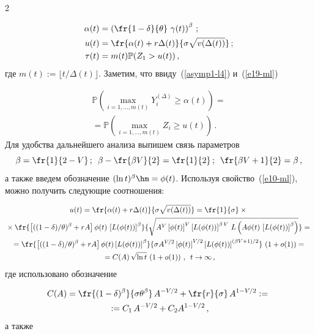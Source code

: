 \begin{multicols}{2}
\vspace*{-2pt}

\noindent
\begin{align*}
\alpha(t)&=\left( \fr{1-\delta}{\theta}\,\,\gamma (t) \right)^\beta\,;\\
u(t)&= \fr{ \alpha(t)+r\Delta(t)}{\sigma\sqrt{v(\Delta(t))}}\,;\\
\tau(t)&= m(t)\mathbb{P}(Z_1>u(t))\,,
\end{align*}
где $m(t):=\lfloor t/\Delta(t)\rfloor$. Заметим, что ввиду~(\ref{asymp1-l4}) и~(\ref{e19-ml})

\vspace*{-2pt}

\noindent
\begin{multline}
\mathbb{P} \left( \max\limits_{i=1,\ldots, m(t)} Y_i^{(\Delta)} \geq \alpha(t)
\right) = {}\\
{}=\mathbb{P} \left( \max\limits_{i=1,\ldots ,m(t)} Z_i \geq u(t)
\right)\,.
\label{e27-ml}
\end{multline}
Для удобства дальнейшего анализа выпишем связь параметров
\begin{equation*}
\beta=\fr{1}{2-V}\,;\enskip \beta-\fr{\beta V}{2}=\fr{1}{2}\,;\enskip
\fr{\beta V +1}{2}=\beta\,,
\end{equation*}
а также введем обозначение  $(\ln t)^\beta\hm=\phi(t)$.
 Используя свойство~(\ref{e10-ml}), можно получить следующие соотношения:
 
 \noindent
\begin{multline*}
u(t) =  \fr{ \alpha(t)+r\Delta(t) }{\sigma\sqrt{v(\Delta(t))}}=\fr{1}{\sigma}\times{}\\
{}\times\fr{\left[((1-\delta)/\theta)^\beta+rA\right] \phi(t)\,
\left[L(  \phi(t))\right]^\beta}{\sqrt{ A^V \left[\phi(t)\right]^ V \left[L ( \phi(t)
)\right]^{\beta \,V}\,L\left( A \phi(t)\,\left[L(
\phi(t))\right]^\beta\right )}}={}\\
{}= \fr{\left[((1-\delta)/\theta)^\beta+rA\right]
\phi(t) \left[L(\phi(t))\right]^\beta} {\sigma A^{{V}/{2}}
\left[\phi(t)\right]^{{V}/{2}}\left[L(\phi(t))\right]^{(\beta V+1)/2}}\,
\left(1+o(1)\right)={}\\
{}=C(A)\,\sqrt{\ln t}\,\left(1+o(1)\right)\,,\enskip t \to \infty\,,
\end{multline*}
где использовано обозначение

\noindent
\begin{multline*}
C(A)=\fr{(1-\delta)^\beta}{\sigma\theta^\beta}\,
A^{-{V}/{2}}+\fr{r}{\sigma}\,A^{1-{V}/{2}}:={}\\
{}:=C_1\,A^{-{V}/{2}}+C_2 A^{1-{V}/{2}}\,,
\end{multline*}
а также


\end{multicols}
